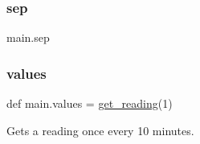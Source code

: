 \subsubsection{\texorpdfstring{sep}{sep}}
{\footnotesize\ttfamily main.\+sep}

\mbox{\label{namespacemain_a17b0e348aeb04d6902b433a3436c48d1}} 
\subsubsection{\texorpdfstring{values}{values}}
{\footnotesize\ttfamily def main.\+values = \mbox{\hyperlink{namespacemain_a8c1b4e8df74031b6ee2d0809895a7c87}{get\+\_\+reading}}(1)}



Gets a reading once every 10 minutes. 


